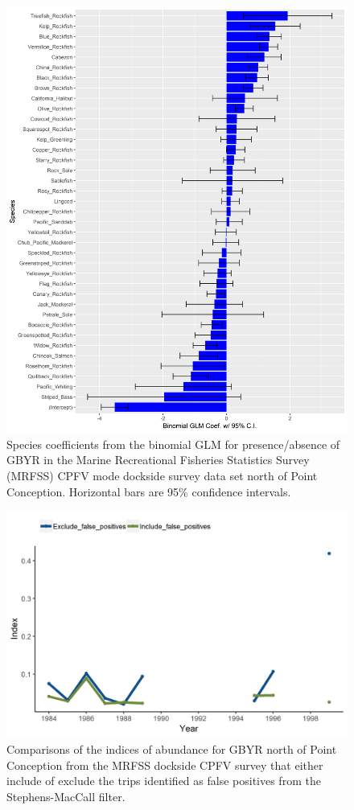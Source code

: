 \documentclass[12pt,]{article}
\begin{document}
\begin{figure}
\centering
\includegraphics{Figures/Fleet10_SM_filter.png}
\caption{Species coefficients from the binomial GLM for presence/absence
of GBYR in the Marine Recreational Fisheries Statistics Survey (MRFSS)
CPFV mode dockside survey data set north of Point Conception. Horizontal
bars are 95\% confidence intervals. \label{fig:Fleet10_SM_filter}}
\end{figure}

\begin{figure}
\centering
\includegraphics{Figures/MRFSS_index_N_SM_falsepos.png}
\caption{Comparisons of the indices of abundance for GBYR north of Point
Conception from the MRFSS dockside CPFV survey that either include of
exclude the trips identified as false positives from the
Stephens-MacCall filter. \label{fig:MRFSS_index_N_SM_falsepos}}
\end{figure}
\end{document}
